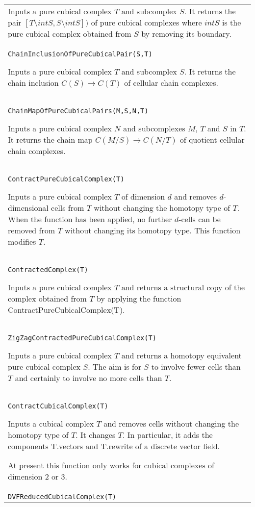 \documentclass[a4paper,11pt]{report}
\begin{document}
{\begin{center}
\begin{tabular}{|l|}
 Inputs a pure cubical complex $T$ and subcomplex $S$. It returns the pair $[T\setminus intS, S\setminus intS])$ of pure cubical complexes where $intS$ is the pure cubical complex obtained from $S$ by removing its boundary. \\
 \index{ChainInclusionOfPureCubicalPair} \texttt{ChainInclusionOfPureCubicalPair(S,T)} 

 Inputs a pure cubical complex $T$ and subcomplex $S$. It returns the chain inclusion $C(S) \rightarrow C(T)$ of cellular chain complexes. \\
 \index{ChainMapOfPureCubicalPairs} \texttt{ChainMapOfPureCubicalPairs(M,S,N,T)} 

 Inputs a pure cubical complex $N$ and subcomplexes $M$, $T$ and $S$ in $T$. It returns the chain map $C(M/S) \rightarrow C(N/T)$ of quotient cellular chain complexes. \\
 \index{ContractPureCubicalComplex} \texttt{ContractPureCubicalComplex(T)} 

 Inputs a pure cubical complex $T$ of dimension $d$ and removes $d$-dimensional cells from $T$ without changing the homotopy type of $T$. When the function has been applied, no further $d$-cells can be removed from $T$ without changing its homotopy type. This function modifies $T$. \\
 \index{ContractedComplex} \texttt{ContractedComplex(T)} 

 Inputs a pure cubical complex $T$ and returns a structural copy of the complex obtained from $T$ by applying the function ContractPureCubicalComplex(T). \\
 \index{ZigZagContractedPureCubicalComplex} \texttt{ZigZagContractedPureCubicalComplex(T)} 

 Inputs a pure cubical complex $T$ and returns a homotopy equivalent pure cubical complex $S$. The aim is for $S$ to involve fewer cells than $T$ and certainly to involve no more cells than $T$. \\
 \index{ContractCubicalComplex} \texttt{ContractCubicalComplex(T)} 

 Inputs a cubical complex $T$ and removes cells without changing the homotopy type of $T$. It changes $T$. In particular, it adds the components T.vectors and T.rewrite of a discrete
vector field. 

 At present this function only works for cubical complexes of dimension 2 or 3. \\
 \index{DVFReducedCubicalComplex} \texttt{DVFReducedCubicalComplex(T)} 


\end{tabular}
\end{center}}
\end{document}
